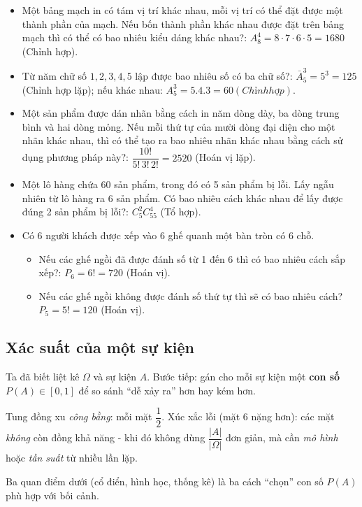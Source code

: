 \documentclass[12pt,a4paper]{article}
\begin{document}
\begin{vidu}[title={Ví dụ đếm}]
\begin{itemize}
  \item Một bảng mạch in có tám vị trí khác nhau, mỗi vị trí có thể đặt được một thành phần của mạch. Nếu bốn thành phần khác nhau được đặt trên bảng mạch thì có thể có bao nhiêu kiểu dáng khác nhau?: $A_8^4 = 8 \cdot 7 \cdot 6 \cdot 5 = 1680$ (Chỉnh hợp).
  \item Từ năm chữ số $1, 2, 3, 4, 5$ lập được bao nhiêu số có ba chữ số?: $\bar{A}_5^3 = 5^3 = 125$ (Chỉnh hợp lặp); nếu khác nhau: $A_5^3 = 5.4.3 = 60 (Chỉnh hợp)$.
  \item Một sản phẩm được dán nhãn bằng cách in năm dòng dày, ba dòng trung bình và hai dòng mỏng. Nếu mỗi thứ tự của mười dòng đại diện cho một nhãn khác nhau, thì có thể tạo ra bao nhiêu nhãn khác nhau bằng cách sử dụng phương pháp này?: $\dfrac{10!}{5!\,3!\,2!} = 2520$ (Hoán vị lặp).
  \item Một lô hàng chứa 60 sản phẩm, trong đó có 5 sản phẩm bị lỗi. Lấy ngẫu nhiên từ lô hàng ra 6 sản phẩm. Có bao nhiêu cách khác nhau để lấy được đúng 2 sản phẩm bị lỗi?: $C_5^2 C_{55}^4$ (Tổ hợp).
  \item Có 6 người khách được xếp vào 6 ghế quanh một bàn tròn có 6 chỗ.
  \begin{itemize}
    \item Nếu các ghế ngồi đã được đánh số từ 1 đến 6 thì có bao nhiêu cách sắp xếp?: $P_6 = 6! = 720$ (Hoán vị).
    \item Nếu các ghế ngồi không được đánh số thứ tự thì sẽ có bao nhiêu cách? $P_5 = 5! = 120$ (Hoán vị).
  \end{itemize}
\end{itemize}
\end{vidu}

\subsection{Xác suất của một sự kiện}

\begin{dongco}
Ta đã biết liệt kê $\Omega$ và sự kiện $A$. Bước tiếp: gán cho mỗi sự kiện một \textbf{con số} $P(A) \in [0,1]$ để so sánh ``dễ xảy ra'' hơn hay kém hơn.

Tung đồng xu \emph{công bằng}: mỗi mặt $\dfrac{1}{2}$. Xúc xắc lỗi (mặt 6 nặng hơn): các mặt \emph{không} còn đồng khả năng - khi đó không dùng $\dfrac{|A|}{|\Omega|}$ đơn giản, mà cần \emph{mô hình} hoặc \emph{tần suất} từ nhiều lần lặp.

Ba quan điểm dưới (cổ điển, hình học, thống kê) là ba cách ``chọn'' con số $P(A)$ phù hợp với bối cảnh.
\end{dongco}
\end{document}
